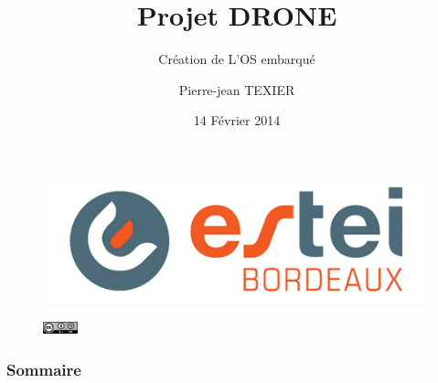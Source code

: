\documentclass[11pt]{beamer}
\title[segment SOL]{Projet DRONE}
\subtitle{Création de L'OS embarqué}
\institute{ Ecole Supérieure des Technologies Electronique Informatique Infographie  }
\author{Pierre-jean \textsc{TEXIER}}
\date{14 Février 2014}
\begin{document}
	\begin{frame}
		\maketitle

		\begin{figure}
			\begin{center}
				\includegraphics{commons/estei.png}
			\end{center}
		\end{figure}
		\begin{figure}
			\begin{center}
				\includegraphics[width=1cm]{commons/cc.png}
			\end{center}
		\end{figure}
		
	\end{frame}
		
	\begin{frame}
		\frametitle{Sommaire}
		\begin{columns}[t]
		\begin{column}{5cm}
		\tableofcontents[sections={1-4}]
		\end{column}
		\begin{column}{5cm}
		\tableofcontents[sections={5-8}]
		\end{column}
		\end{columns}
	 \end{frame}
	
\end{document}

